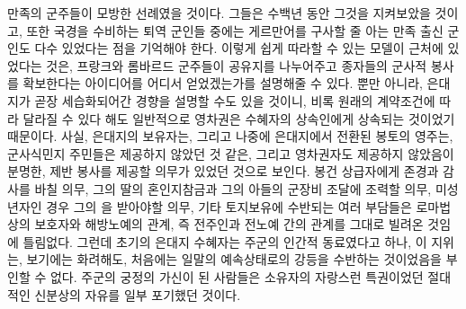 만족의 군주들이 모방한 선례였을 것이다.
그들은 수백년 동안 그것을 지켜보았을 것이고,
또한 국경을 수비하는 퇴역 군인들 중에는
게르만어를 구사할 줄 아는 만족 출신 군인도 다수 있었다는 점을
기억해야 한다.
이렇게 쉽게 따라할 수 있는 모델이 근처에 있었다는 것은,
프랑크와 롬바르드 군주들이
공유지를 나누어주고 종자들의 군사적 봉사를 확보한다는
아이디어를 어디서 얻었겠는가를
설명해줄 수 있다.
뿐만 아니라,
은대지가
곧장 세습화되어간
경향을
설명할 수도 있을 것이니,
비록 원래의 계약조건에 따라 달라질 수 있다 해도
일반적으로 영차권은 수혜자의 상속인에게 상속되는 것이었기 때문이다.
사실,
은대지의 보유자는,
그리고 나중에 은대지에서 전환된 봉토의 영주는,
군사식민지 주민들은 제공하지 않았던 것 같은,
그리고 영차권자도 제공하지 않았음이 분명한,
제반 봉사를
제공할 의무가 있었던 것으로 보인다.
봉건 상급자에게 존경과 감사를 바칠 의무,
그의 딸의 혼인지참금과 그의 아들의 군장비 조달에 조력할 의무,
미성년자인 경우 그의 을 받아야할 의무,
기타 토지보유에 수반되는 여러 부담들은
로마법상의 보호자와 해방노예의 관계,
즉 전주인과 전노예 간의 관계를
그대로 빌려온 것임에 틀림없다.
그런데 초기의 은대지 수혜자는
주군의 인간적 동료였다고 하나,
이 지위는,
보기에는 화려해도,
처음에는 일말의 예속상태로의 강등을 수반하는 것이었음을
부인할 수 없다.
주군의 궁정의 가신이 된 사람들은
 소유자의 자랑스런 특권이었던
절대적인 신분상의 자유를 일부 포기했던 것이다.

